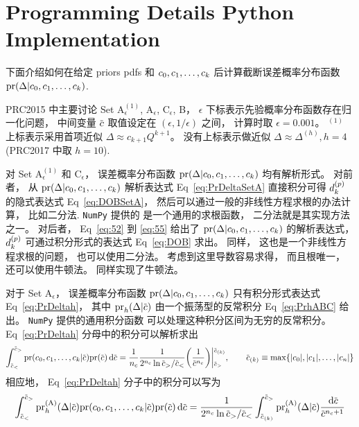 
\section{Programming Details Python Implementation}
下面介绍如何在给定 priors pdfs 和 $c_0,c_1,\ldots,c_k$ 后计算截断误差概率分布函数
$\textrm{pr}(\Delta|c_0,c_1,\ldots,c_k)$.

PRC2015 中主要讨论 Set A${}_\epsilon^{(1)}$, A$_\epsilon$, C$_\epsilon$, B，
$\epsilon $ 下标表示先验概率分布函数存在归一化问题，
中间变量 $\dmscbar$ 取值设定在 $(\epsilon,1/\epsilon)$ 之间，
计算时取 $\epsilon=0.001$。
${}^{(1)}$ 上标表示采用首项近似 $\Delta\approx c_{k+1}Q^{k+1}$。
没有上标表示做近似 $\Delta\approx\Delta^{(h)}, h=4$ (PRC2017 中取 $h=10$).

对 Set A${}_\epsilon^{(1)}$ 和 C${}_\epsilon$，
误差概率分布函数 $\textrm{pr}(\Delta|c_0,c_1,\ldots,c_k)$ 均有解析形式。
对前者，
从 $\textrm{pr}(\Delta|c_0,c_1,\ldots,c_k)$ 解析表达式 Eq~\eqref{eq:PrDeltaSetA}
直接积分可得 $d_k^{(p)}$ 的隐式表达式 Eq~\eqref{eq:DOBSetA}，
然后可以通过一般的非线性方程求根的办法计算，
比如二分法.
\texttt{NumPy} 提供的  是一个通用的求根函数，
二分法就是其实现方法之一。
对后者，
Eq~\eqref{eq:52} 到 \eqref{eq:55} 给出了 $\textrm{pr}(\Delta|c_0,c_1,\ldots,c_k)$
的解析表达式，
$d_k^{(p)}$ 可通过积分形式的表达式 Eq~\eqref{eq:DOB} 求出。
同样，
这也是一个非线性方程求根的问题，
也可以使用二分法。
考虑到这里导数容易求得，
而且根唯一，
还可以使用牛顿法。
 同样实现了牛顿法。

对于 Set A${}_\epsilon$，
误差概率分布函数 $\textrm{pr}(\Delta|c_0,c_1,\ldots,c_k)$ 只有积分形式表达式
Eq~\eqref{eq:PrDeltah}，
其中 $\dmspr_h(\Delta|\dmscbar)$ 由一个振荡型的反常积分
Eq~\eqref{eq:PrhABC} 给出。
\texttt{NumPy} 提供的通用积分函数 
可以处理这种积分区间为无穷的反常积分。
Eq~\eqref{eq:PrDeltah} 分母中的积分可以解析求出
\begin{equation}
  \int_{\dmscbar_<}^{\dmscbar_>}
  \dmspr(\dmsccck|\dmscbar)\dmspr(\dmscbar)\dmsdif\dmscbar
  = \frac{1}{n_c} \frac{1}{2^{n_c}\ln\dmscbar_>/\dmscbar_<}
  \biggl(\frac{1}{\dmscbar^{n_c}}\biggr)\dmsvat[\bigg]{\dmscbar_>}{
    \dmscbar_{(k)}},\qquad
  \dmscbar_{(k)}\equiv\max\{|c_0|,|c_1|,\ldots,|c_n|\}
\end{equation}
相应地，
Eq~\eqref{eq:PrDeltah} 分子中的积分可以写为
\begin{equation}
  \int_{\dmscbar_<}^{\dmscbar_>}\dmspr_h^{\textrm{(A)}}(\Delta|\dmscbar) 
  \dmspr(\dmsccck|\dmscbar)\dmspr(\dmscbar)\dmsdif\dmscbar
  = \frac{1}{2^{n_c}\ln\dmscbar_>/\dmscbar_<}
  \int_{\dmscbar_{(k)}}^{\dmscbar_>}\dmspr_h^{\textrm{(A)}}(\Delta|\dmscbar)
  \frac{\dmsdif\dmscbar}{\dmscbar^{n_c+1}}
\end{equation}

